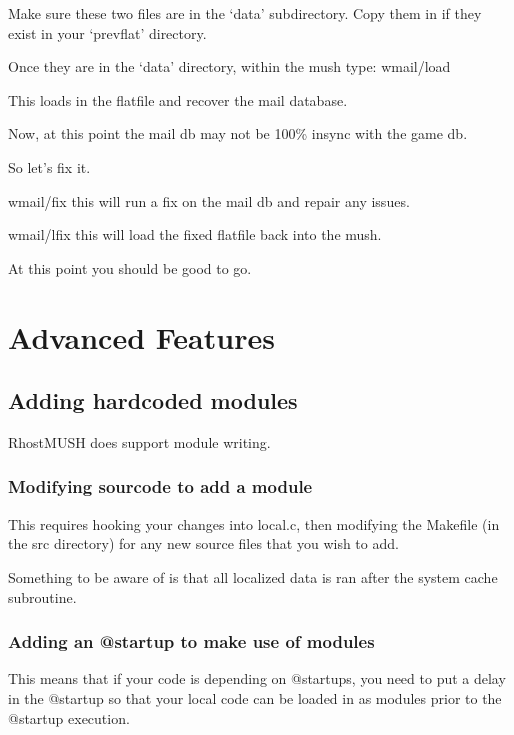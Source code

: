 \documentclass[letterpaper,10pt,english]{sphinxmanual}
\begin{document}
\sphinxAtStartPar
Make sure these two files are in the ‘data’ subdirectory.  Copy them in
if they exist in your ‘prevflat’ directory.

\sphinxAtStartPar
Once they are in the ‘data’ directory, within the mush type: wmail/load

\sphinxAtStartPar
This loads in the flatfile and recover the mail database.

\sphinxAtStartPar
Now, at this point the mail db may not be 100\% in\sphinxhyphen{}sync with the game db.

\sphinxAtStartPar
So let’s fix it.

\sphinxAtStartPar
wmail/fix   \textendash{} this will run a fix on the mail db and repair any issues.

\sphinxAtStartPar
wmail/lfix  \textendash{} this will load the fixed flatfile back into the mush.

\sphinxAtStartPar
At this point you should be good to go.


\chapter{Advanced Features}
\label{\detokenize{advanced:advanced-features}}\label{\detokenize{advanced::doc}}

\section{Adding hardcoded modules}
\label{\detokenize{advanced:adding-hardcoded-modules}}
\sphinxAtStartPar
RhostMUSH does support module writing.


\subsection{Modifying sourcode to add a module}
\label{\detokenize{advanced:modifying-sourcode-to-add-a-module}}
\sphinxAtStartPar
This requires hooking your changes into local.c, then modifying the Makefile (in the src directory)
for any new source files that you wish to add.

\sphinxAtStartPar
Something to be aware of is that all localized data is ran after the system cache subroutine.


\subsection{Adding an @startup to make use of modules}
\label{\detokenize{advanced:adding-an-startup-to-make-use-of-modules}}
\sphinxAtStartPar
This means that if your code is depending on @startups, you need to put a delay in the @startup
so that your local code can be loaded in as modules prior to the @startup execution.
\end{document}
